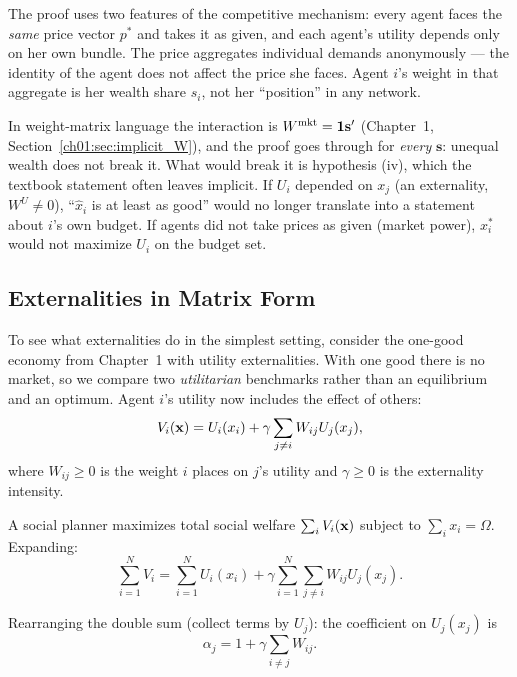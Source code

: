 \documentclass[../structural_economics_book.tex]{subfiles}
\begin{document}
\begin{intuition}
The proof uses two features of the competitive mechanism: every agent faces the \textit{same} price vector $p^*$ and takes it as given, and each agent's utility depends only on her own bundle. The price aggregates individual demands anonymously --- the identity of the agent does not affect the price she faces. Agent $i$'s weight in that aggregate is her wealth share $s_i$, not her ``position'' in any network.

In weight-matrix language the interaction is $W^{\text{mkt}} = \mathbf{1}\mathbf{s}'$ (Chapter~1, Section~\ref{ch01:sec:implicit_W}), and the proof goes through for \textit{every} $\mathbf{s}$: unequal wealth does not break it. What would break it is hypothesis (iv), which the textbook statement often leaves implicit. If $U_i$ depended on $x_j$ (an externality, $W^U \neq 0$), ``$\hat x_i$ is at least as good'' would no longer translate into a statement about $i$'s own budget. If agents did not take prices as given (market power), $x_i^*$ would not maximize $U_i$ on the budget set.
\end{intuition}


\subsection{Externalities in Matrix Form}

To see what externalities do in the simplest setting, consider the one-good economy from Chapter~1 with utility externalities. With one good there is no market, so we compare two \textit{utilitarian} benchmarks rather than an equilibrium and an optimum. Agent $i$'s utility now includes the effect of others:
\begin{equation}\label{ch02:eq:social_utility}
V_i(\mathbf{x}) = U_i(x_i) + \gamma \sum_{j \neq i} W_{ij} U_j(x_j),
\end{equation}
where $W_{ij} \geq 0$ is the weight $i$ places on $j$'s utility and $\gamma \geq 0$ is the externality intensity.

A social planner maximizes total social welfare $\sum_i V_i(\mathbf{x})$ subject to $\sum_i x_i = \Omega$. Expanding:
\begin{equation}\label{ch02:eq:planner_expanded}
\sum_{i=1}^N V_i = \sum_{i=1}^N U_i(x_i) + \gamma \sum_{i=1}^N \sum_{j \neq i} W_{ij} U_j(x_j).
\end{equation}

Rearranging the double sum (collect terms by $U_j$): the coefficient on $U_j(x_j)$ is
\begin{equation}\label{ch02:eq:planner_weight}
\alpha_j = 1 + \gamma \sum_{i \neq j} W_{ij}.
\end{equation}
\end{document}
